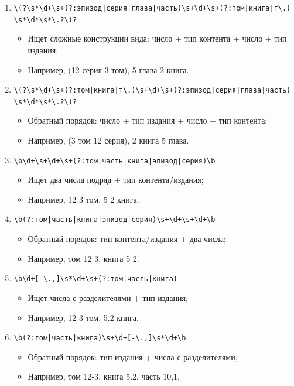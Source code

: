 \documentclass[coursework]{SCWorks}
\begin{document}
    \begin{enumerate}
        \item \verb~\(?\s*\d+\s+(?:эпизод|серия|глава|часть)\s+\d+\s+(?:том|книга|т\.)~\\ \verb~\s*\d*\s*\.?\)?~
        \begin{itemize}
            \item Ищет сложные конструкции вида: {число + тип контента + число + тип издания};
            \item Например, (12 серия 3 том), 5 глава 2 книга.
        \end{itemize}

        \item \verb~\(?\s*\d+\s+(?:том|книга|т\.)\s+\d+\s+(?:эпизод|серия|глава|часть)~\\ \verb~\s*\d*\s*\.?\)?~
        \begin{itemize}
            \item Обратный порядок: {число + тип издания + число + тип контента};
            \item Например, (3 том 12 серия), 2 книга 5 глава.
        \end{itemize}

        \item \verb~\b\d+\s+\d+\s+(?:том|часть|книга|эпизод|серия)\b~
        \begin{itemize}
            \item Ищет два числа подряд + тип контента/издания;
            \item Например, 12 3 том, 5 2 книга.
        \end{itemize}

        \item \verb~\b(?:том|часть|книга|эпизод|серия)\s+\d+\s+\d+\b~
        \begin{itemize}
            \item Обратный порядок: {тип контента/издания + два числа};
            \item Например, том 12 3, книга 5 2.
        \end{itemize}

        \item \verb~\b\d+[-\.,]\s*\d+\s+(?:том|часть|книга)~
        \begin{itemize}
            \item Ищет числа с разделителями + тип издания;
            \item Например, 12-3 том, 5.2 книга.
        \end{itemize}

        \item \verb~\b(?:том|часть|книга)\s+\d+[-\.,]\s*\d+\b~
        \begin{itemize}
            \item Обратный порядок: {тип издания + числа с разделителями};
            \item Например, том 12-3, книга 5.2, часть 10,1.
        \end{itemize}
    \end{enumerate}
\end{document}
